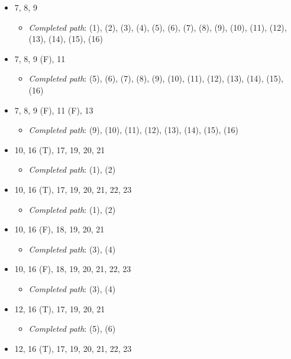 \documentclass{article}
\newcommand{\completedpath}{\textit{Completed path}}
\begin{document}
\begin{itemize}
    \item 7, 8, 9
          \begin{itemize}
              \item \completedpath: (1), (2), (3), (4), (5), (6), (7), (8), (9), (10), (11), (12), (13), (14), (15), (16)
          \end{itemize}
    \item 7, 8, 9 (F), 11
          \begin{itemize}
              \item \completedpath: (5), (6), (7), (8), (9), (10), (11), (12), (13), (14), (15), (16)
          \end{itemize}
    \item 7, 8, 9 (F), 11 (F), 13
          \begin{itemize}
              \item \completedpath: (9), (10), (11), (12), (13), (14), (15), (16)
          \end{itemize}
    \item 10, 16 (T), 17, 19, 20, 21
          \begin{itemize}
              \item \completedpath: (1), (2)
          \end{itemize}
    \item 10, 16 (T), 17, 19, 20, 21, 22, 23
          \begin{itemize}
              \item \completedpath: (1), (2)
          \end{itemize}
    \item 10, 16 (F), 18, 19, 20, 21
          \begin{itemize}
              \item \completedpath: (3), (4)
          \end{itemize}
    \item 10, 16 (F), 18, 19, 20, 21, 22, 23
          \begin{itemize}
              \item \completedpath: (3), (4)
          \end{itemize}
    \item 12, 16 (T), 17, 19, 20, 21
          \begin{itemize}
              \item \completedpath: (5), (6)
          \end{itemize}
    \item 12, 16 (T), 17, 19, 20, 21, 22, 23

\end{itemize}
\end{document}
